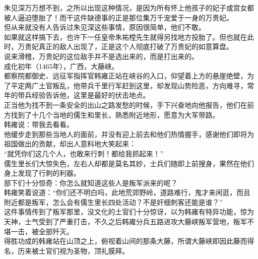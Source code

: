 \begin{multicols}{\theparacolNo}
朱见深万万想不到，之所以出现这种情况，是因为所有怀上他孩子的妃子或宫女都被人逼迫堕胎了！而干这件缺德事的正是那位集万千宠爱于一身的万贵妃。\\

但从来就没有人告诉过朱见深这些事情，原因很简单，他们不敢。\\

如果就这样搞下去，也许下一任皇帝朱祐樘先生就得另找地方投胎了。但也就在此时，万贵妃真正的敌人出现了，正是这个人彻底打破了万贵妃的如意算盘。\\

说来滑稽，万贵妃的这位敌手并不是选出来的，而是打出来的。\\

成化初年（1465年），广西，大藤峡。\\

都察院都御史、远征军指挥官韩雍正站在峡谷的入口，仰望着上方的悬崖绝壁，为了平定两广土官叛乱，他带兵千里行军赶到这里，却发现山势险恶，方向难寻，常年的带兵经验告诉他，这里是最好的伏击地点。\\

正当他为找不到一条安全的出山之路发愁的时候，手下兴奋地向他报告，他们在前方找到了十几个当地的儒生和里长，熟悉附近地形，愿意为大军带路。\\

韩雍说：带我去看看。\\

他缓步走到那些当地人的面前，并没有迎上前去和他们热情握手，感谢他们即将为祖国做出的贡献，却出人意料地大笑起来：\\

“就凭你们这几个人，也敢来行刺！都给我抓起来！”\\

儒生里长们大惊失色，左右人却都是莫名其妙，士兵们随即上前搜身，果然在他们身上发现了行刺的利器。\\

部下们十分惊奇：你怎么就知道这些人是叛军派来的呢？\\

韩雍笑着说道：“你们还不明白吗，此地荒郊野岭，道路难行，鬼才来闲逛，而且附近都是叛军，怎么会有儒生里长四处活动？不是奸细刺客还能是谁？”\\

这件事情传到了叛军那里，没文化的土官们十分惊讶，以为韩雍有特异功能，惊为天神，士气受到了严重打击，不久之后韩雍分兵五路进攻大藤峡叛军营地，叛军不堪一击，被全部歼灭。\\

得胜功成的韩雍站在山顶之上，俯视着山间的那条大藤，所谓大藤峡即因此藤而得名，历来被土官们视为圣物，顶礼膜拜。\\


\end{multicols}

